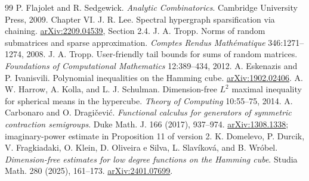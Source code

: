 \documentclass[11pt]{article}
\theoremstyle{remark}\newtheorem{remark}[theorem]{Remark}
\begin{document}
\begin{thebibliography}{99}
P. Flajolet and R. Sedgewick. \emph{Analytic Combinatorics}.
Cambridge University Press, 2009. Chapter VI.
J. R. Lee. Spectral hypergraph sparsification via chaining.
\href{https://arxiv.org/abs/2209.04539}{arXiv:2209.04539}, Section 2.4.
J. A. Tropp. Norms of random submatrices and sparse approximation.
\emph{Comptes Rendus Math\'ematique} 346:1271--1274, 2008.
J. A. Tropp. User-friendly tail bounds for sums of random matrices.
\emph{Foundations of Computational Mathematics} 12:389--434, 2012.
A. Eskenazis and P. Ivanisvili.
Polynomial inequalities on the Hamming cube.
\href{https://arxiv.org/abs/1902.02406}{arXiv:1902.02406}.
A. W. Harrow, A. Kolla, and L. J. Schulman.
Dimension-free $L^2$ maximal inequality for spherical means in the
hypercube. \emph{Theory of Computing} 10:55--75, 2014.
 A. Carbonaro and O. Dragi\v cevi\'c.
\emph{Functional calculus for generators of symmetric contraction semigroups}.
Duke Math. J. 166 (2017), 937--974.
\href{https://arxiv.org/abs/1308.1338}{arXiv:1308.1338}; imaginary-power estimate in Proposition 11 of version 2.
 K. Domelevo, P. Durcik, V. Fragkiadaki, O. Klein, D. Oliveira e Silva, L. Slav\'ikov\'a, and B. Wr\'obel.
\emph{Dimension-free estimates for low degree functions on the Hamming cube}.
Studia Math. 280 (2025), 161--173.
\href{https://arxiv.org/abs/2401.07699}{arXiv:2401.07699}.

\end{thebibliography}
\end{document}
